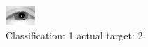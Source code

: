\begin{figure}[h!]
\begin{center}
\includegraphics[width=0.60\columnwidth]{figures/ID2252_class_1_target_2.png}
\end{center}
\caption{ Classification: 1 actual target: 2}
\label{fig:ID2252_class_1_target_2}
\end{figure}
